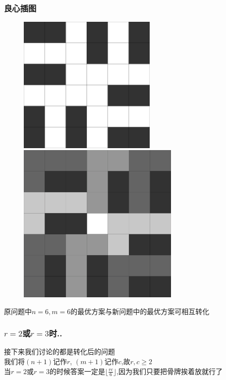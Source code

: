 \documentclass{beamer}
\begin{document}
			\begin{frame}\frametitle{良心插图}
				\begin{figure}[htbp]
					\centering
					\begin{minipage}[t]{0.49\textwidth}
						\centering
						\includegraphics[width=0.6\textwidth]{pictures/1-1.png}
					\end{minipage}
					\begin{minipage}[t]{0.49\textwidth}
						\centering
						\includegraphics[width=0.7\textwidth]{pictures/1-2.png}
					\end{minipage}
				\end{figure}

				原问题中$n=6,m=6$的最优方案与新问题中的最优方案可相互转化
			\end{frame}
			\begin{frame}\frametitle{$r=2$或$r=3$时..}
				接下来我们讨论的都是转化后的问题\\
				我们将$(n+1)$记作$r$, $(m+1)$记作$c$,故$r,c\ge2$\\
				当$r=2$或$r=3$的时候答案一定是$\lfloor\frac{rc}6\rfloor$,因为我们只要把骨牌挨着放就行了
			\end{frame}
\end{document}
